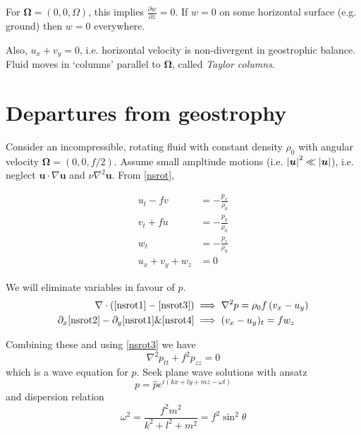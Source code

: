 \documentclass{jknotes}
\begin{document}
For $\bm{\Omega} = (0, 0, \Omega)$, this implies $\frac{\partial w}{\partial
z} = 0$. If $w = 0$ on some horizontal surface (e.g. ground) then $w=0$
everywhere. 

Also, $u_x + v_y = 0$, i.e. horizontal velocity is non-divergent in
geostrophic balance. Fluid moves in `columns' parallel to $\bm{\Omega}$,
called \emph{Taylor columns}.

\section{Departures from geostrophy}
Consider an incompressible, rotating fluid with constant density $\rho_0$ with
angular velocity $\bm{\Omega} = (0, 0, f/2)$. Assume small ampltiude motions
(i.e. $\abs{\bm{u}}^2 \ll \abs{\bm{u}}$), i.e. neglect $\bm{u}\cdot \nabla
\bm{u}$ and $\nu \nabla^2 \bm{u}$. From \eqref{nsrot},

\begin{align}
	u_t - fv &= -\frac{p_x}{\rho_0} \label{nsrot1} \\
	v_t + fu &= -\frac{p_y}{\rho_0} \label{nsrot2}\\
	w_t &= -\frac{p_z}{\rho_0} \label{nsrot3}\\
	u_x + v_y + w_z &= 0 \label{nsrot4}
\end{align}

We will eliminate variables in favour of $p$.
\begin{equation}
	\begin{aligned}
		\nabla \cdot \left( \eqref{nsrot1} - \eqref{nsrot3}\right) &\implies
\nabla^2 p = \rho_0 f\left(v_x - u_y\right) \\
\partial_x \eqref{nsrot2} - \partial_y \eqref{nsrot1} \& \eqref{nsrot4}
&\implies (v_x-u_y)_t = fw_z \\
\end{aligned}
\end{equation}

Combining these and using \eqref{nsrot3} we have
\begin{equation}
	\nabla^2 p_{tt} + f^2 p_{zz} = 0
\end{equation}
which is a wave equation for $p$. Seek plane wave solutions with ansatz 
\begin{equation}
	p = \hat{p}e^{i\left(kx + ly + mz-\omega t\right)}
\end{equation}
and dispersion relation
\begin{equation}
	\omega^2 = \frac{f^2 m^2}{k^2+l^2+m^2} = f^2 \sin^2 \theta
\end{equation}
\end{document}
